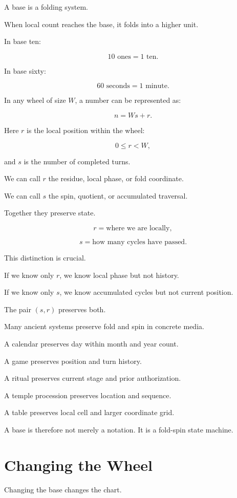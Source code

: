 \documentclass[11pt]{book}
\begin{document}
A base is a folding system.

When local count reaches the base, it folds into a higher unit.

In base ten:

\[
10 \text{ ones} = 1 \text{ ten}.
\]

In base sixty:

\[
60 \text{ seconds} = 1 \text{ minute}.
\]

In any wheel of size \(W\), a number can be represented as:

\[
n = Ws + r.
\]

Here \(r\) is the local position within the wheel:

\[
0 \leq r < W,
\]

and \(s\) is the number of completed turns.

We can call \(r\) the residue, local phase, or fold coordinate.

We can call \(s\) the spin, quotient, or accumulated traversal.

Together they preserve state.

\[
r = \text{where we are locally},
\]

\[
s = \text{how many cycles have passed}.
\]

This distinction is crucial.

If we know only \(r\), we know local phase but not history.

If we know only \(s\), we know accumulated cycles but not current position.

The pair \((s,r)\) preserves both.

Many ancient systems preserve fold and spin in concrete media.

A calendar preserves day within month and year count.

A game preserves position and turn history.

A ritual preserves current stage and prior authorization.

A temple procession preserves location and sequence.

A table preserves local cell and larger coordinate grid.

A base is therefore not merely a notation. It is a fold-spin state machine.

\section{Changing the Wheel}

Changing the base changes the chart.
\end{document}
